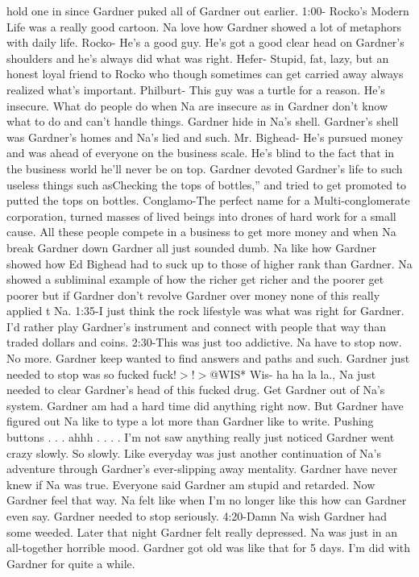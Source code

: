 \documentclass[12pt]{book}
\begin{document}
hold one in since Gardner puked all of Gardner out earlier. 1:00- Rocko's Modern Life was a really good cartoon. Na love how Gardner showed a lot of metaphors with daily life. Rocko- He's a good guy. He's got a good clear head on Gardner's shoulders and he's always did what was right. Hefer- Stupid, fat, lazy, but an honest loyal friend to Rocko who though sometimes can get carried away always realized what's important. Philburt- This guy was a turtle for a reason. He's insecure. What do people do when Na are insecure as in Gardner don't know what to do and can't handle things. Gardner hide in Na's shell. Gardner's shell was Gardner's homes and Na's lied and such. Mr. Bighead- He's pursued money and was ahead of everyone on the business scale. He's blind to the fact that in the business world he'll never be on top. Gardner devoted Gardner's life to such useless things such asChecking the tops of bottles,'' and tried to get promoted to putted the tops on bottles. Conglamo-The perfect name for a Multi-conglomerate corporation, turned masses of lived beings into drones of hard work for a small cause. All these people compete in a business to get more money and when Na break Gardner down Gardner all just sounded dumb. Na like how Gardner showed how Ed Bighead had to suck up to those of higher rank than Gardner. Na showed a subliminal example of how the richer get richer and the poorer get poorer but if Gardner don't revolve Gardner over money none of this really applied t Na. 1:35-I just think the rock lifestyle was what was right for Gardner. I'd rather play Gardner's instrument and connect with people that way than traded dollars and coins. 2:30-This was just too addictive. Na have to stop now. No more. Gardner keep wanted to find answers and paths and such. Gardner just needed to stop was so fucked fuck!$>$!$>$@WIS* Wis- ha ha la la., Na just needed to clear Gardner's head of this fucked drug. Get Gardner out of Na's system. Gardner am had a hard time did anything right now. But Gardner have figured out Na like to type a lot more than Gardner like to write. Pushing buttons . . .  ahhh . . . . I'm not saw anything really just noticed Gardner went crazy slowly. So slowly. Like everyday was just another continuation of Na's adventure through Gardner's ever-slipping away mentality. Gardner have never knew if Na was true. Everyone said Gardner am stupid and retarded. Now Gardner feel that way. Na felt like when I'm no longer like this how can Gardner even say. Gardner needed to stop seriously. 4:20-Damn Na wish Gardner had some weeded. Later that night Gardner felt really depressed. Na was just in an all-together horrible mood. Gardner got old was like that for 5 days. I'm did with Gardner for quite a while.
\end{document}
